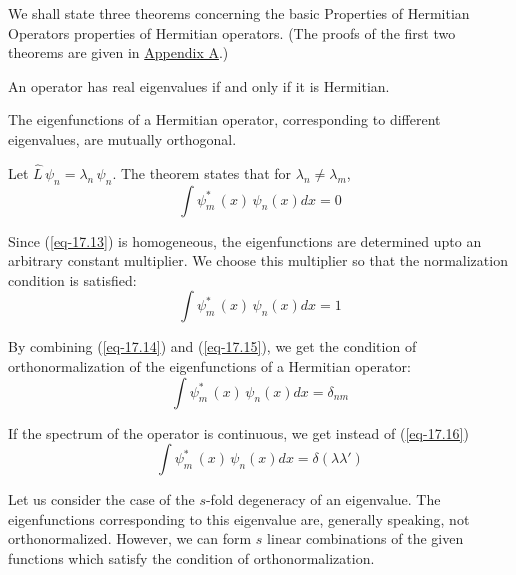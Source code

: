 \documentclass[a4paper,sfsidenotes,colorlinks=true]{tufte-book}
\numberwithin{equation}{section}
\numberwithin{figure}{section}
\begin{document}
We shall state three theorems concerning the basic Properties of
Hermitian Operators properties of Hermitian operators. (The proofs of
the first two theorems are given in \hyperref[appendix-a]{Appendix A}.)
\begin{description}[style=nextline, leftmargin=1cm, font=\rmfamily\bfseries]
\item[First Theorem]

An operator has real eigenvalues if and only if it is Hermitian.  

\item[Second Theorem]

The eigenfunctions of a Hermitian operator, corresponding to different
eigenvalues, are mutually orthogonal.  

Let $\hat{L} \, \psi_{n} = \lambda_{n} \, \psi_{n}$. The theorem states that
for $\lambda_{n} \ne \lambda_{m}$,
\begin{equation}%
\int \psi_{m}^{*} \,(x) \, \psi_{n} (x) dx = 0 
\label{eq-17.14}
\end{equation}

Since (\ref{eq-17.13}) is homogeneous, the eigenfunctions are determined
  upto an arbitrary constant multiplier. We choose this multiplier so
  that the normalization condition is satisfied: 
\begin{equation}%
\int \psi_{m}^{*} \,(x) \, \psi_{n} (x) dx = 1
\label{eq-17.15}
\end{equation}

By combining (\ref{eq-17.14}) and (\ref{eq-17.15}), we get the
condition of orthonormalization of the eigenfunctions of a Hermitian
operator:
\begin{equation}%
\int \psi_{m}^{*} \,(x) \, \psi_{n} (x) dx = \delta_{nm}
\label{eq-17.16}
\end{equation}

If the spectrum of the operator is continuous, we get instead of
(\ref{eq-17.16})
\begin{equation}%
\int \psi_{m}^{*} \,(x) \, \psi_{n} (x) dx = \delta (\lambda \lambda')
\label{eq-17.17}
\end{equation}

Let us consider the case of the $s$-fold degeneracy of an
eigenvalue. The eigenfunctions corresponding to this eigenvalue are,
generally speaking, not orthonormalized. However, we can form $s$ linear
combinations of the given functions which satisfy the condition of
orthonormalization.

\item[Third Theorem]


\end{description}
\end{document}
